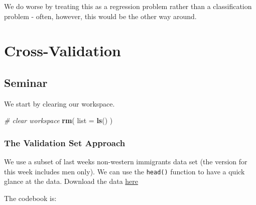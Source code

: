 \documentclass[]{article}
\newenvironment{Shaded}{\begin{snugshade}}{\end{snugshade}}
\newcommand{\CommentTok}[1]{\textcolor[rgb]{0.56,0.35,0.01}{\textit{#1}}}
\newcommand{\DataTypeTok}[1]{\textcolor[rgb]{0.13,0.29,0.53}{#1}}
\newcommand{\KeywordTok}[1]{\textcolor[rgb]{0.13,0.29,0.53}{\textbf{#1}}}
\newcommand{\NormalTok}[1]{#1}
\begin{document}
We do worse by treating this as a regression problem rather than a classification problem - often, however, this would be the other way around.

\hypertarget{cross-validation}{%
\section{Cross-Validation}\label{cross-validation}}

\hypertarget{seminar-1}{%
\subsection{Seminar}\label{seminar-1}}

We start by clearing our workspace.

\begin{Shaded}
\begin{Highlighting}[]
\CommentTok{# clear workspace}
\KeywordTok{rm}\NormalTok{( }\DataTypeTok{list =} \KeywordTok{ls}\NormalTok{() )}
\end{Highlighting}
\end{Shaded}

\hypertarget{the-validation-set-approach}{%
\subsubsection{The Validation Set Approach}\label{the-validation-set-approach}}

We use a subset of last weeks non-western immigrants data set (the version for this week includes men only). We can use the \texttt{head()} function to have a quick glance at the data. Download the data \href{http://philippbroniecki.github.io/ML2017.io/data/BSAS_manip_men.RData}{here}

The codebook is:
\end{document}
